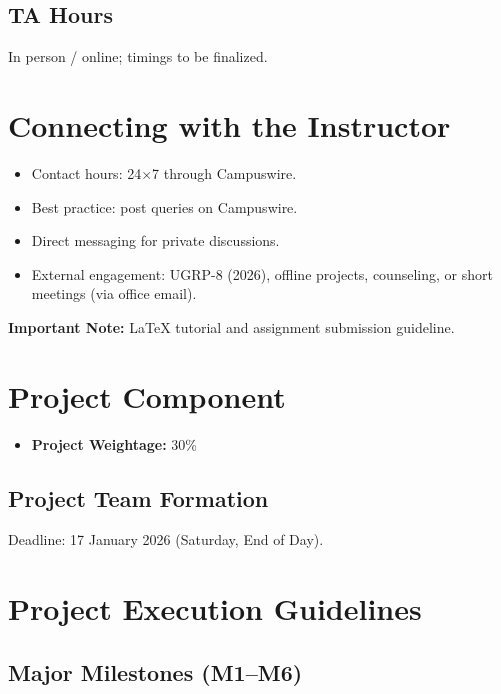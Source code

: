 \documentclass[11pt]{article}
\begin{document}
\subsection*{TA Hours}
In person / online; timings to be finalized.

\section{Connecting with the Instructor}

\begin{itemize}
    \item Contact hours: 24$\times$7 through Campuswire.
    \item Best practice: post queries on Campuswire.
    \item Direct messaging for private discussions.
    \item External engagement: UGRP-8 (2026), offline projects, counseling, or short meetings (via office email).
\end{itemize}

\textbf{Important Note:} LaTeX tutorial and assignment submission guideline.

\section{Project Component}

\begin{itemize}
    \item \textbf{Project Weightage:} 30\%
\end{itemize}

\subsection*{Project Team Formation}
Deadline: 17 January 2026 (Saturday, End of Day).

\section{Project Execution Guidelines}

\subsection*{Major Milestones (M1--M6)}
\end{document}
